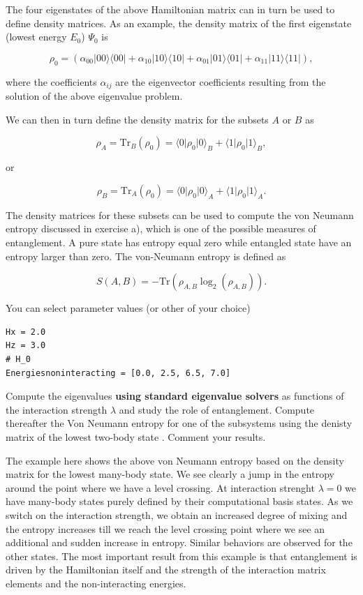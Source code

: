 \documentclass[%
oneside,                 %
final,                   %
10pt]{article}
\begin{document}
The four eigenstates of the above Hamiltonian matrix can in turn be used to
define density matrices. As an example, the density matrix of the
first eigenstate (lowest energy $E_0$) $\Psi_0$ is

\[
\rho_0=\left(\alpha_{00}\vert 00 \rangle\langle 00\vert+\alpha_{10}\vert 10 \rangle\langle 10\vert+\alpha_{01}\vert 01 \rangle\langle 01\vert+\alpha_{11}\vert 11 \rangle\langle 11\vert\right),
\]

where the coefficients $\alpha_{ij}$ are the eigenvector coefficients
resulting from the solution of the above eigenvalue problem.

We can
then in turn define the density matrix for the subsets $A$ or $B$ as

\[
\rho_A=\mathrm{Tr}_B(\rho_{0})=\langle 0 \vert \rho_{0} \vert 0\rangle_{B}+\langle 1 \vert \rho_{0} \vert 1\rangle_{B},
\]

or

\[
\rho_B=\mathrm{Tr}_A(\rho_0)=\langle 0 \vert \rho_{0} \vert 0\rangle_{A}+\langle 1 \vert \rho_{0} \vert 1\rangle_{A}.
\]

The density matrices for these subsets can be used to compute the
von Neumann entropy discussed in exercise a), which is one of the possible measures
of entanglement. A pure state has entropy equal zero while entangled
state have an entropy larger than zero. The von-Neumann entropy is
defined as

\[
S(A,B)=-\mathrm{Tr}\left(\rho_{A,B}\log_2 (\rho_{A,B})\right).
\]

You can select parameter values (or other of your choice)





\begin{verbatim}
Hx = 2.0
Hz = 3.0
# H_0
Energiesnoninteracting = [0.0, 2.5, 6.5, 7.0]

\end{verbatim}


Compute the eigenvalues \textbf{using standard eigenvalue solvers} as functions of
the interaction strength $\lambda$ and study the role of entanglement.
Compute thereafter the Von Neumann entropy for one of the subsystems using the denisty matrix  of the lowest
two-body state . Comment your results.

The example here shows the above von Neumann entropy based on the
density matrix for the lowest many-body state. We see clearly a jump
in the entropy around the point where we have a level crossing. At
interaction strenght $\lambda=0$ we have many-body states purely
defined by their computational basis states. As we switch on the
interaction strength, we obtain an increased degree of mixing and the
entropy increases till we reach the level crossing point where we see
an additional and sudden increase in entropy. Similar behaviors are
observed for the other states. The most important result from this
example is that entanglement is driven by the Hamiltonian itself and
the strength of the interaction matrix elements and the
non-interacting energies.
\end{document}
